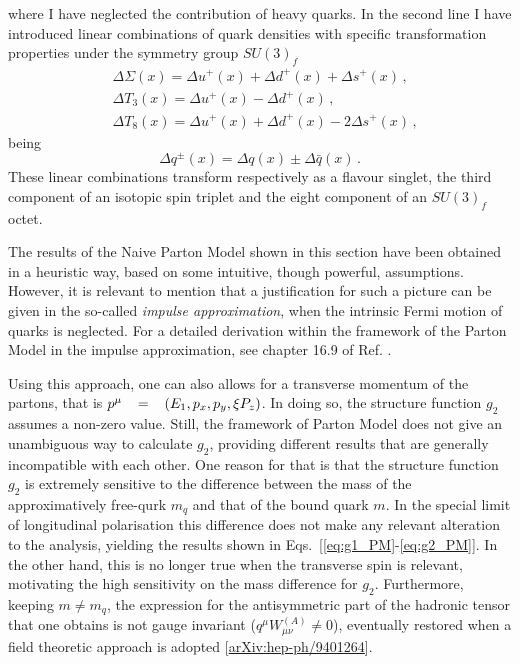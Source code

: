 where I have neglected the contribution of heavy quarks. In the second line I have introduced linear combinations of quark densities with specific transformation properties under the symmetry group $SU(3)_{f}$
\begin{align}
  & \Delta \Sigma (x) = \Delta u^{+} (x) + \Delta d^{+} (x) +\Delta s^{+} (x) \,, \\
  & \Delta T_3 (x) = \Delta u^{+} (x) - \Delta d^{+} (x) \,, \\
  & \Delta T_8 (x) = \Delta u^{+} (x) + \Delta d^{+} (x) - 2 \Delta s^{+} (x) \,,
\end{align}
being 
\begin{equation}
 \Delta q^{\pm}(x) = \Delta q(x) \pm \Delta \bar{q}(x) \,.
\end{equation}
These linear combinations transform respectively as a flavour singlet, the third component of an isotopic spin triplet and the eight component of an $SU(3)_{f}$ octet.\par 
The results of the Naive Parton Model shown in this section have been obtained in a heuristic way, based on some intuitive, though powerful, assumptions. However, it is relevant to mention that a justification for such a picture can be given in the so-called \textit{impulse approximation}, when the intrinsic Fermi motion of quarks is neglected. For a detailed derivation within the framework of the Parton Model in the impulse approximation, see chapter 16.9 of Ref. \cite{leader_predazzi_1996}.\par
Using this approach, one can also allows for a transverse momentum of the partons, that is $p^{\mu} \hspace{3mm}  = \hspace{3mm} \left( E_1, p_x, p_y, \xi P_{z} \right)$. In doing so, the structure function $g_2$ assumes a non-zero value. Still, the framework of Parton Model does not give an unambiguous way to calculate $g_2$, providing different results that are generally incompatible with each other. One reason for that is that the structure function $g_2$ is extremely sensitive to the difference between the mass of the approximatively free-qurk $m_q$ and that of the bound quark $m$. In the special limit of longitudinal polarisation this difference does not make any relevant alteration to the analysis, yielding the results shown in Eqs.~[\ref{eq:g1_PM}-\ref{eq:g2_PM}]. In the other hand, this is no longer true when the transverse spin is relevant, motivating the high sensitivity on the mass difference for $g_2$. Furthermore, keeping $m \neq m_{q}$, the expression for the antisymmetric part of the hadronic tensor that one obtains is not gauge invariant ($q^{\mu} W_{\mu \nu}^{(A)} \neq 0$), eventually restored when a field theoretic approach is adopted [\href{https://arxiv.org/abs/hep-ph/9401264}{arXiv:hep-ph/9401264}].\par
